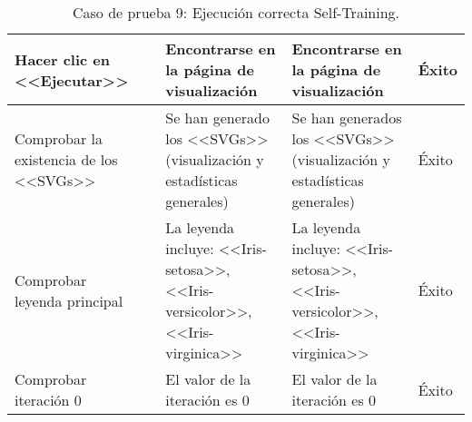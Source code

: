 \begin{table}[H]
\begin{tabular}{p{}p{}p{}p{}p{}}
Hacer clic en <<Ejecutar>>                            &                        & Encontrarse en la página de visualización                            & Encontrarse en la página de visualización                    & Éxito                            \\ \hline
Comprobar la existencia de los <<SVGs>>               &                        & Se han generado los <<SVGs>> (visualización y estadísticas generales) & Se han generados los <<SVGs>> (visualización y estadísticas generales)& Éxito  \\ \hline 
Comprobar leyenda principal                           &                        & La leyenda incluye: <<Iris-setosa>>, <<Iris-versicolor>>, <<Iris-virginica>> & La leyenda incluye: <<Iris-setosa>>, <<Iris-versicolor>>, <<Iris-virginica>> & Éxito \\ \hline
Comprobar iteración 0                                 &                        & El valor de la iteración es 0                                        & El valor de la iteración es 0                                & Éxito \\ \hline
\end{tabular}
\caption{Caso de prueba 9: Ejecución correcta Self-Training.}
\end{table}


